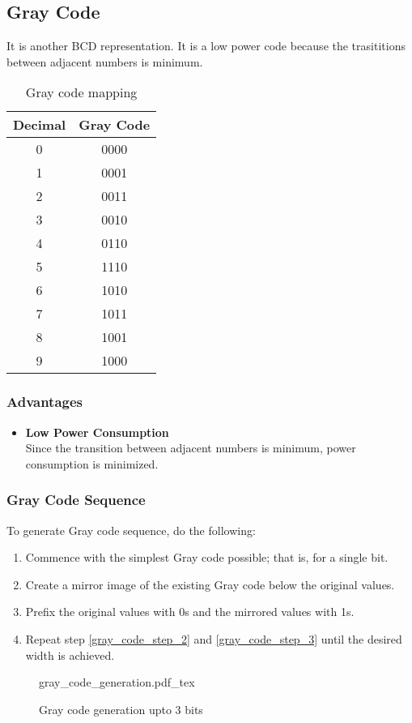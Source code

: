 \documentclass[oneside]{book}
\newcommand{\incfig}[1]{%
    {#1.pdf_tex}
}
\begin{document}
\subsection{Gray Code}
It is another BCD representation. It is a low power code because the trasititions between adjacent numbers is minimum.
\begin{table}[ht]
	\centering
	\begin{tabular}{|cc|}
		\hline
		Decimal & Gray Code \\
		\hline
		0       & 0000      \\
		1       & 0001      \\
		2       & 0011      \\
		3       & 0010      \\
		4       & 0110      \\
		5       & 1110      \\
		6       & 1010      \\
		7       & 1011      \\
		8       & 1001      \\
		9       & 1000      \\
		\hline
	\end{tabular}
	\caption{Gray code mapping}
\end{table}
\subsubsection{Advantages}
\begin{itemize}
	\item \textbf{Low Power Consumption}\\
	      Since the transition between adjacent numbers is minimum, power consumption is minimized.
\end{itemize}
\subsubsection{Gray Code Sequence}
To generate Gray code sequence, do the following\cite{gray_code_generation}:
\begin{enumerate}
	\item Commence with the simplest Gray code possible; that is, for a single bit.
	\item Create a mirror image of the existing Gray code below the original values.
	      \label{gray_code_step_2}
	\item Prefix the original values with 0s and the mirrored values with 1s.
	      \label{gray_code_step_3}
	\item Repeat step \ref{gray_code_step_2} and \ref{gray_code_step_3} until the desired width is achieved.
\end{enumerate}
\begin{figure}
	\centering
	\incfig{gray_code_generation}
	\caption{Gray code generation upto 3 bits}
	\label{gray_code_generation}
\end{figure}
\end{document}

